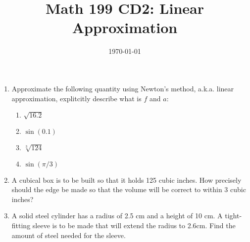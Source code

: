 \documentclass[12pt]{article}
\title{Math 199 CD2: Linear Approximation}
\date{\today}
\begin{document}
	
	\maketitle

	\begin{enumerate}
		\item Approximate the following quantity using Newton's method, a.k.a. linear approximation, explitcitly describe what is $f$ and $a$:
		\begin{enumerate}
			\item $\sqrt{16.2}$
			\vskip 3cm
			\item $\sin(0.1)$
			\vskip 3cm
			\item$\sqrt[3]{124}$
			\vskip 3cm
			\item $\sin(\pi/3)$
		\end{enumerate}
	\newpage
	\item A cubical box is to be built so that it holds 125 cubic inches. How precisely should the edge be made so that the volume will be correct to within 3 cubic inches?
	\vskip 5cm
	
	\item A solid steel cylinder has a radius of 2.5 cm and a height of 10 cm. A tight-fitting sleeve is to be made that will
	extend the radius to 2.6cm. Find the amount of steel needed for the sleeve.
	\vskip 5cm
	\end{enumerate}
	
\end{document}

